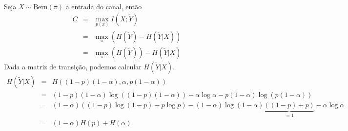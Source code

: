 \begin{questions}
\begin{solution}
Seja $X \sim \text{Bern}(\pi)$ a entrada do canal, então
\begin{eqnarray}
C &=& \max_{p(x)} I(X;\tilde{Y}) \nonumber \\
        &=& \max_{\pi} \left( H(\tilde{Y}) - H(\tilde{Y}|X) \right) \nonumber \\
        &=& \max_{\pi} \left( H(\tilde{Y}) \right) - H(\tilde{Y}|X) 
\end{eqnarray}
Dada a matriz de transição, podemos calcular $H(\tilde{Y}|X)$.
\begin{eqnarray}
H(\tilde{Y}|X) &=& H\left( (1-p)(1-\alpha), \alpha, p(1-\alpha) \right) \nonumber \\
        &=& (1-p)(1-\alpha) \log \left( (1-p)(1-\alpha) \right) - \alpha \log \alpha - p(1-\alpha) \log \left( p(1-\alpha) \right) \nonumber \\
        &=& (1-\alpha) \left( (1-p) \log (1-p) - p \log p \right) - (1-\alpha) \log (1-\alpha) \underbrace{\left( (1-p) + p \right)}_{=1} - \alpha \log \alpha \nonumber \\
        &=& (1-\alpha) H(p) + H(\alpha)
\end{eqnarray}



\end{solution}
\end{questions}
